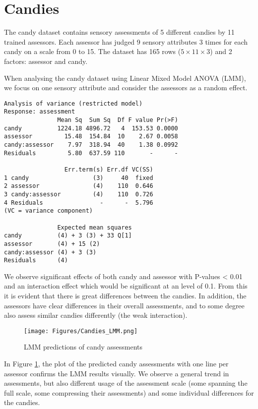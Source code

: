 \section{Candies}

The candy dataset contains sensory assessments of 5 different candies by 11 trained assessors. Each assessor has judged 9 sensory attributes 3 times for each candy on a scale from 0 to 15. The dataset has 165 rows ($5 \times 11 \times 3$) and 2 factors: assessor and candy.

When analysing the candy dataset using Linear Mixed Model ANOVA (LMM), we focus on one sensory attribute and consider the assessors as a random effect. 

\begin{verbatim}
Analysis of variance (restricted model)
Response: assessment
               Mean Sq  Sum Sq  Df F value Pr(>F)
candy          1224.18 4896.72   4  153.53 0.0000
assessor         15.48  154.84  10    2.67 0.0058
candy:assessor    7.97  318.94  40    1.38 0.0992
Residuals         5.80  637.59 110       -      -

                 Err.term(s) Err.df VC(SS)
1 candy                  (3)     40  fixed
2 assessor               (4)    110  0.646
3 candy:assessor         (4)    110  0.726
4 Residuals                -      -  5.796
(VC = variance component)

               Expected mean squares
candy          (4) + 3 (3) + 33 Q[1]
assessor       (4) + 15 (2)         
candy:assessor (4) + 3 (3)          
Residuals      (4)
\end{verbatim}

We observe significant effects of both candy and assessor with P-values < 0.01 and an interaction effect which would be significant at an \alpha level of 0.1. From this it is evident that there is great differences between the candies. In addition, the assessors have clear differences in their overall assessments, and to some degree also assess similar candies differently (the weak interaction).

\begin{figure}[h!]
 \centering
 \texttt{[image: Figures/Candies\_LMM.png]}
 \caption{\footnotesize LMM predictions of candy assessments}
 \label{FigChx:Candies_LMM}
\end{figure}

In Figure \ref{FigChx:Candies_LMM}, the plot of the predicted candy assessments with one line per assessor confirms the LMM results visually. We observe a general trend in assessments, but also different usage of the assessment scale (some spanning the full scale, some compressing their assessments) and some individual differences for the candies.

